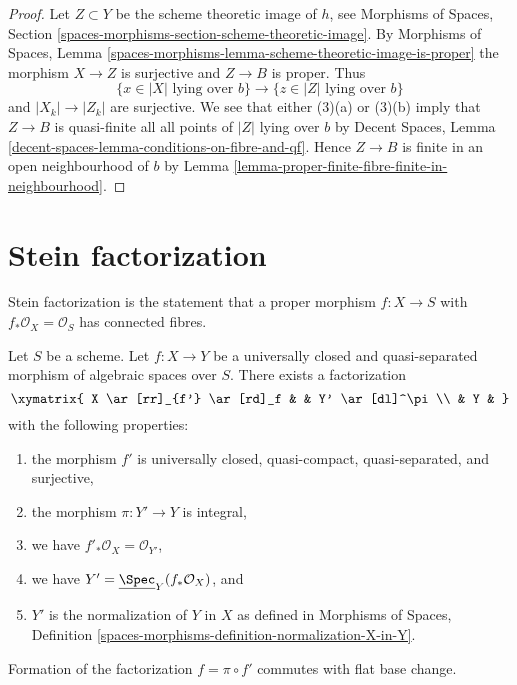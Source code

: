 \begin{proof}
Let $Z \subset Y$ be the scheme theoretic image of $h$, see
Morphisms of Spaces, Section
\ref{spaces-morphisms-section-scheme-theoretic-image}.
By Morphisms of Spaces, Lemma
\ref{spaces-morphisms-lemma-scheme-theoretic-image-is-proper}
the morphism $X \to Z$ is surjective and $Z \to B$ is proper.
Thus
$$
\{x \in |X|\text{ lying over }b\} \to
\{z \in |Z|\text{ lying over }b\}
$$
and $|X_k| \to |Z_k|$ are surjective. We see that either
(3)(a) or (3)(b) imply that $Z \to B$ is quasi-finite
all all points of $|Z|$ lying over $b$ by
Decent Spaces, Lemma \ref{decent-spaces-lemma-conditions-on-fibre-and-qf}.
Hence $Z \to B$ is finite in an open neighbourhood of $b$ by
Lemma \ref{lemma-proper-finite-fibre-finite-in-neighbourhood}.
\end{proof}







\section{Stein factorization}
\label{section-stein-factorization}

\noindent
Stein factorization is the statement that a proper morphism $f : X \to S$
with $f_*\mathcal{O}_X = \mathcal{O}_S$ has connected fibres.

\begin{lemma}
\label{lemma-stein-universally-closed}
Let $S$ be a scheme. Let $f : X \to Y$ be a universally closed and
quasi-separated morphism of algebraic spaces over $S$.
There exists a factorization
$$
\xymatrix{
X \ar[rr]_{f'} \ar[rd]_f & & Y' \ar[dl]^\pi \\
& Y &
}
$$
with the following properties:
\begin{enumerate}
\item the morphism $f'$ is universally closed, quasi-compact, quasi-separated,
and surjective,
\item the morphism $\pi : Y' \to Y$ is integral,
\item we have $f'_*\mathcal{O}_X = \mathcal{O}_{Y'}$,
\item we have $Y' = \underline{\Spec}_Y(f_*\mathcal{O}_X)$, and
\item $Y'$ is the normalization of $Y$ in $X$ as defined in
Morphisms of Spaces, Definition
\ref{spaces-morphisms-definition-normalization-X-in-Y}.
\end{enumerate}
Formation of the factorization $f = \pi \circ f'$ commutes with flat
base change.
\end{lemma}

